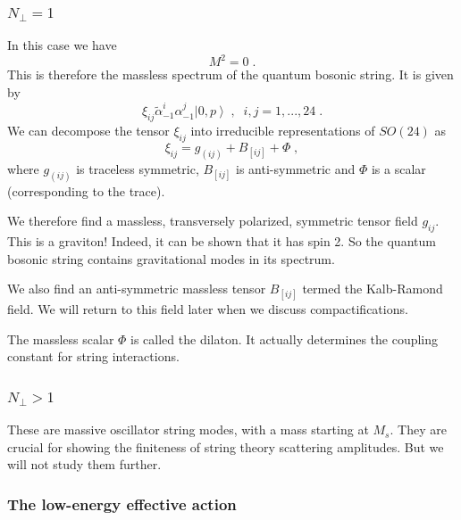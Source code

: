\documentclass[11pt,a4paper]{article}
\numberwithin{equation}{section}
\numberwithin{table}{section}\setlength{\multlinegap}{25pt}
\newcommand{\be}{\begin{equation}}
\newcommand{\ee}{\end{equation}}
\begin{document}
\subsubsection*{$N_{\perp}=1$}

In this case we have 
\be
M^2 = 0 \;.
\ee
This is therefore the massless spectrum of the quantum bosonic string. It is given by 
\be
\xi_{ij} \tilde{\alpha}^i_{-1} \alpha^j_{-1} \left|0,p\right> \;,\;\; i,j=1,...,24 \;.
\ee
We can decompose the tensor $\xi_{ij}$ into irreducible representations of $SO(24)$ as
\be
\xi_{ij} = g_{\left(ij\right)} + B_{\left[ij\right]} + \Phi \;, 
\label{decomp}
\ee
where $g_{\left(ij\right)}$ is traceless symmetric, $ B_{\left[ij\right]} $ is anti-symmetric and $\Phi$ is a scalar (corresponding to the trace).

We therefore find a massless, transversely polarized, symmetric tensor field $g_{ij}$. This is a graviton! Indeed, it can be shown that it has spin 2. So the quantum bosonic string contains gravitational modes in its spectrum. 

We also find an anti-symmetric massless tensor $ B_{\left[ij\right]} $ termed the Kalb-Ramond field. We will return to this field later when we discuss compactifications. 

The massless scalar $\Phi$ is called the dilaton. It actually determines the coupling constant for string interactions. 

\subsubsection*{$N_{\perp}>1$}

These are massive oscillator string modes, with a mass starting at $M_s$. They are crucial for showing the finiteness of string theory scattering amplitudes. But we will not study them further.

\subsubsection{The low-energy effective action}
\end{document}

